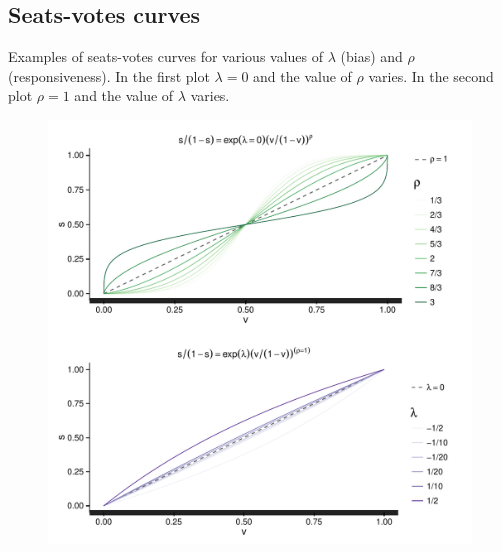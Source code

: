 \clearpage
\label{AppendixB}
\vspace{-1.75cm}
\subsection{Seats-votes curves}

Examples of seats-votes curves for various values of $\lambda$ (bias) and $\rho$ (responsiveness). 
In the first plot $\lambda =0 $ and the value of $\rho$ varies. In the second plot 
$\rho = 1$ and the value of $\lambda$ varies. 

\begin{figure}[h]
\centering
	\includegraphics[scale=0.8]{sections/figs/seats_votes}
\label{fig:seats_votes}
\end{figure}


